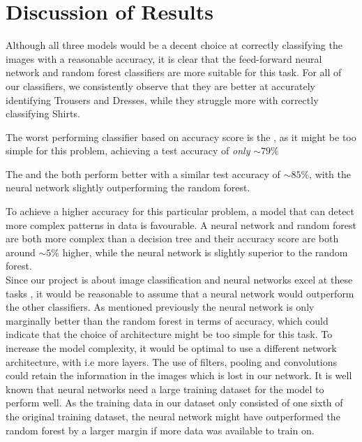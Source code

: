 \section{Discussion of Results}
Although all three models would be a decent choice at correctly classifying the images with a reasonable accuracy, it is clear that the feed-forward neural network and random forest classifiers are more suitable for this task.
For all of our classifiers, we consistently observe that they are better at accurately identifying Trousers and Dresses, while they struggle more with correctly classifying Shirts.
\newline

The worst performing classifier based on accuracy score is the , as it might be too simple for this problem, achieving a test accuracy of \textit{only} $\sim79\%$
\newline

The  and the  both perform better with a similar test accuracy of $\sim85\%$, with the neural network slightly outperforming the random forest.
\newline

To achieve a higher accuracy for this particular problem, a model that can detect more complex patterns in data is favourable.
A neural network and random forest are both more complex than a decision tree and their accuracy score are both around $\sim5\%$ higher,
while the neural network is slightly superior to the random forest. \\

Since our project is about image classification and neural networks excel at these tasks \cite{handsonML}, it would be reasonable to assume that a neural network would outperform the other classifiers.
As mentioned previously the neural network is only marginally better than the random forest in terms of accuracy, which could indicate that the choice of architecture might be too simple for this task.
To increase the model complexity, it would be optimal to use a different network architecture, with i.e more layers.
The use of filters, pooling and convolutions could retain the information in the images which is lost in our network.
It is well known that neural networks need a large training dataset for the model to perform well.
As the training data in our dataset only consisted of one sixth of the original training dataset,
the neural network might have outperformed the random forest by a larger margin if more data was available to train on.


